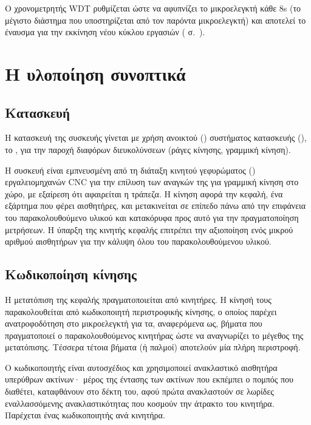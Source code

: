 Ο χρονομετρητής WDT ρυθμίζεται ώστε να αφυπνίζει το μικροελεγκτή κάθε 8s (το
μέγιστο διάστημα που υποστηρίζεται από τον παρόντα μικροελεγκτή) και αποτελεί το
έναυσμα για την εκκίνηση νέου κύκλου εργασιών
( σ.~\pageref{ssubsec:task:initiate}).


\section{Η υλοποίηση συνοπτικά}


\subsection{Κατασκευή}

Η κατασκευή της συσκευής γίνεται με χρήση ανοικτού ()
συστήματος κατασκευής (), το , για
την παροχή διαφόρων διευκολύνσεων (ράγες κίνησης, γραμμική κίνηση).

Η συσκευή είναι εμπνευσμένη από τη διάταξη κινητού γεφυρώματος () εργαλειομηχανών CNC για την επίλυση των αναγκών της για γραμμική κίνηση
στο χώρο, με εξαίρεση ότι αφαιρείται η τράπεζα.
Η κίνηση αφορά την κεφαλή, ένα εξάρτημα που φέρει αισθητήρες, και μετακινείται
σε επίπεδο πάνω από την επιφάνεια του παρακολουθούμενο υλικού και κατακόρυφα
προς αυτό για την πραγματοποίηση μετρήσεων. Η ύπαρξη της κινητής κεφαλής
επιτρέπει την αξιοποίηση ενός μικρού αριθμού αισθητήρων για την κάλυψη όλου του
παρακολουθούμενου υλικού.


\subsection{Κωδικοποίηση κίνησης}

Η μετατόπιση της κεφαλής πραγματοποιείται από κινητήρες. Η κίνησή τους
παρακολουθείται από κωδικοποιητή περιστροφικής κίνησης, ο οποίος παρέχει
ανατροφοδότηση στο μικροελεγκτή για τα, αναφερόμενα ως, βήματα που πραγματοποιεί
ο παρακολουθούμενος κινητήρας ώστε να αναγνωρίζει το μέγεθος της μετατόπισης.
Τέσσερα τέτοια βήματα (ή παλμοί) αποτελούν μία πλήρη περιστροφή.

Ο κωδικοποιητής είναι αυτοσχέδιος και χρησιμοποιεί ανακλαστικό αισθητήρα
υπερύθρων ακτίνων· μέρος της έντασης των ακτίνων που εκπέμπει ο πομπός που
διαθέτει, καταφθάνουν στο δέκτη του, αφού πρώτα ανακλαστούν σε λωρίδες
εναλλασσόμενης ανακλαστικότητας που κοσμούν την άτρακτο του κινητήρα. Παρέχεται
ένας κωδικοποιητής ανά κινητήρα.

